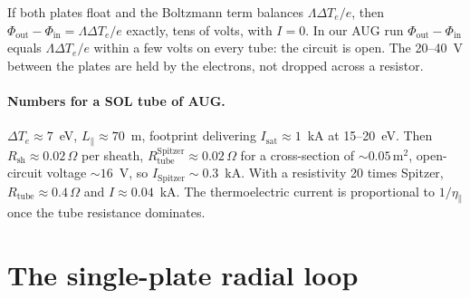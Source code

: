 \documentclass[11pt,a4paper]{article}
\newcommand{\Te}{T_e}
\begin{document}
\begin{tcolorbox}[warn={Watch out: a potential difference between the plates is not a current}]
If both plates float and the Boltzmann term balances $\Lambda\Delta\Te/e$, then $\Phi_{\mathrm{out}} - \Phi_{\mathrm{in}}
= \Lambda\Delta\Te/e$ exactly, tens of volts, with $I = 0$. In our AUG run $\Phi_{\mathrm{out}}-\Phi_{\mathrm{in}}$
equals $\Lambda\Delta\Te/e$ within a few volts on every tube: the circuit is open. The 20--40~V between the plates are
held by the electrons, not dropped across a resistor.
\end{tcolorbox}

\paragraph{Numbers for a SOL tube of AUG.} $\Delta\Te \approx 7$~eV, $L_\parallel \approx 70$~m, footprint delivering
$I_{\mathrm{sat}}\approx 1$~kA at 15--20~eV. Then $R_{\mathrm{sh}} \approx 0.02\,\Omega$ per sheath,
$R_{\mathrm{tube}}^{\mathrm{Spitzer}} \approx 0.02\,\Omega$ for a cross-section of $\sim 0.05\,\mathrm{m^2}$, open-circuit
voltage $\sim 16$~V, so $I_{\mathrm{Spitzer}} \sim 0.3$~kA. With a resistivity 20 times Spitzer,
$R_{\mathrm{tube}} \approx 0.4\,\Omega$ and $I \approx 0.04$~kA. The thermoelectric current is proportional to
$1/\eta_\parallel$ once the tube resistance dominates.

\section{The single-plate radial loop}
\label{sec:loop}
\end{document}
